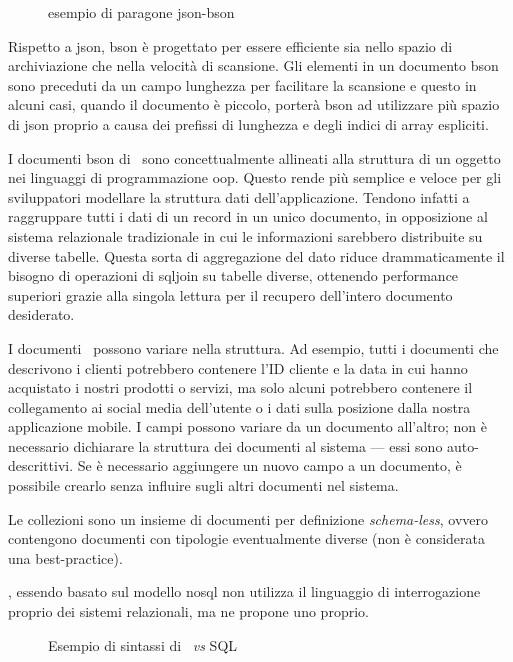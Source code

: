\begin{figure}[!h] 
	\centering    
	
	\caption[ esempio di paragone \acrshort{json}-\acrshort{bson}]{ esempio di paragone \acrshort{json}-\acrshort{bson}}
	\label{fig:json-bson}
\end{figure}
\noindent
Rispetto a \acrshort{json}, \acrshort{bson} è progettato per essere efficiente sia nello spazio di archiviazione che nella velocità di scansione. Gli elementi in un documento \acrshort{bson} sono preceduti da un campo lunghezza per facilitare la scansione e questo in alcuni casi, quando il documento è piccolo,  porterà \acrshort{bson} ad utilizzare più spazio di \acrshort{json} proprio a causa dei prefissi di lunghezza e degli indici di array espliciti.

I documenti \acrshort{bson} di \mongodb~sono concettualmente allineati alla struttura di un oggetto nei linguaggi di programmazione \acrshort{oop}. Questo rende più semplice e veloce per gli sviluppatori modellare la struttura dati dell'applicazione. Tendono infatti a raggruppare tutti i dati di un record in un unico documento, in opposizione al sistema relazionale tradizionale in cui le informazioni sarebbero distribuite su diverse tabelle. Questa sorta di aggregazione del dato riduce drammaticamente il bisogno di operazioni di \gls{sqljoin} su tabelle diverse, ottenendo performance superiori grazie alla singola lettura per il recupero dell'intero documento desiderato.

I documenti \mongodb~possono variare nella struttura. Ad esempio, tutti i documenti che descrivono i clienti potrebbero contenere l'ID cliente e la data in cui hanno acquistato i nostri prodotti o servizi, ma solo alcuni potrebbero contenere il collegamento ai social media dell'utente o i dati sulla posizione dalla nostra applicazione mobile. I campi possono variare da un documento all'altro; non è necessario dichiarare la struttura dei documenti al sistema --- essi sono auto-descrittivi. Se è necessario aggiungere un nuovo campo a un documento, è possibile crearlo senza influire sugli altri documenti nel sistema.

Le collezioni sono un insieme di documenti per  definizione \textit{schema-less}, ovvero contengono documenti con tipologie eventualmente diverse (non è considerata una best-practice).

\mongodb, essendo basato sul modello \acrshort{nosql} non utilizza il linguaggio di interrogazione proprio dei sistemi relazionali, ma ne propone uno proprio.
\begin{figure}[H] 
	\centering    

	\caption[Esempio di sintassi di \mongodb]{Esempio di sintassi di \mongodb~\textit{vs} SQL}
	\label{fig:mongodb-syntax-example}
\end{figure}

